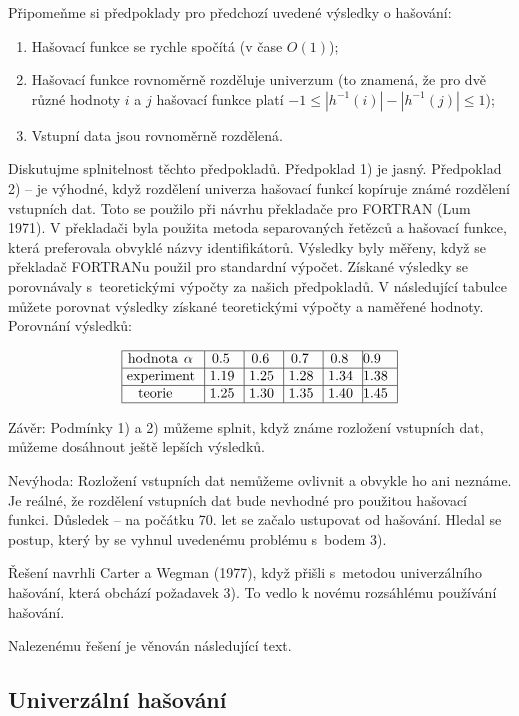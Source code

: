 \documentclass[a4paper,12pt]{article}
\begin{document}
Připomeňme si předpoklady pro předchozí uvedené 
výsledky o hašování:
\begin{enumerate}
\item
Hašovací funkce se rychle spočítá (v čase 
$O(1)$);
\item Hašovací funkce rovnoměrně rozděluje univerzum (to 
znamená, že pro dvě různé hodnoty $i$ a $j$ 
hašovací funkce platí $-1\le |h^{-1}(i)|-|h^{-1}(j)|\le 
1$); 
\item
Vstupní data jsou rovnoměrně rozdělená.
\end{enumerate}

Diskutujme splnitelnost těchto předpokladů.\newline 
Předpoklad 1) je jasný.\newline 
Předpoklad 2) -- je výhodné, 
když rozdělení univerza hašovací funkcí kopíruje známé 
rozděle\-ní vstupních dat. Toto se použilo při návrhu 
překladače pro FORTRAN (Lum 1971). V překladači byla použita metoda separovaných řetězců a hašovací funkce, 
která preferovala obvyklé názvy identifikátorů. Výsledky byly měřeny, když se překladač FORTRANu použil pro standardní výpočet. Získané výsledky se porovnávaly s~teoretickými výpočty za našich předpokladů. V 
následující tabulce můžete porovnat výsledky 
získané teoretickými výpočty a naměřené hodnoty.
Porovnání výsledků:

$$\vtop{\offinterlineskip\halign {\strut\vrule\ # & \vrule\ # & \vrule\ # & \vrule\ # & \vrule\ # & \vrule \hfil # \hfil \vrule\cr\noalign{\hrule}hodnota $\alpha$ & 0.5 & 0.6 & 0.7 & 0.8 & 0.9 \hfill \cr\noalign{\hrule}experiment & 1.19 & 1.25 & 1.28 & 1.34 & 1.38 \cr\noalign{\hrule}teorie & 1.25 & 1.30 & 1.35 & 1.40 & 1.45 \cr\noalign{\hrule}}}$$

Závěr: Podmínky 1) a 2) můžeme splnit, 
když známe rozložení vstupních dat, můžeme 
dosáhnout ještě lepších výsledků.

Nevýhoda: Rozložení vstupních dat 
nemůžeme ovlivnit a obvykle ho ani neznáme. Je 
reálné, že rozdělení vstupních dat bude nevhodné pro 
použitou hašovací funkci. Důsledek -- na počátku 
70. let se začalo ustupovat od hašování. Hledal se postup, 
který by se vyhnul uvedenému problému s~bodem 3).

Řešení navrhli Carter a Wegman (1977), když přišli s~metodou univerzálního hašování, která obchází poža\-davek 3).  
To vedlo k novému rozsáhlému používání hašování.

Nalezenému řešení je věnován následující text.

\subsection{Univerzální hašování}
\end{document}
